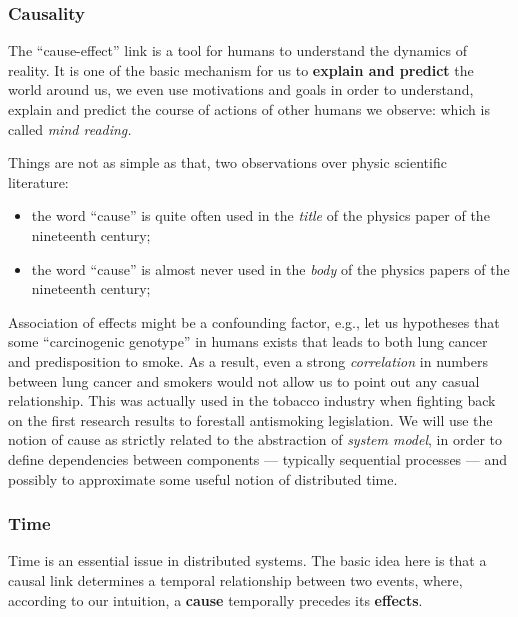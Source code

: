 \documentclass[11pt, a4paper]{article}
\begin{document}
\subsubsection{Causality}\label{sec:causality} %
\begin{note}
    The ``cause-effect'' link is a tool for humans to understand the dynamics of reality.
    It is one of the basic mechanism for us to \textbf{explain and predict} the world around us, we even use motivations and goals in order to understand, explain and predict the course of actions of other humans we observe: which is called \textit{mind reading.}
\end{note}
\begin{note}
    Things are not as simple as that, two observations over physic scientific literature:
    \begin{itemize}
        \item the word ``cause'' is quite often used in the \textit{title} of the physics paper of the nineteenth century;
        \item the word ``cause'' is almost never used in the \textit{body} of the physics papers of the nineteenth century;
    \end{itemize}
\end{note}
Association of effects might be a confounding factor, e.g., let us hypotheses that some ``carcinogenic genotype'' in humans exists that leads to both lung cancer and predisposition to smoke.
As a result, even a strong \textit{correlation} in numbers between lung cancer and smokers would not allow us to point out any casual relationship.
This was actually used in the tobacco industry when fighting back on the first research results to forestall antismoking legislation.
\emptyln{}
We will use the notion of cause as strictly related to the abstraction of \textit{system model}, in order to define dependencies between components --- typically sequential processes --- and possibly to approximate some useful notion of distributed time.
%
\subsubsection{Time}\label{sec:time} %
Time is an essential issue in distributed systems.
The basic idea here is that a causal link determines a temporal relationship between two events, where, according to our intuition, a \textbf{cause} temporally precedes its \textbf{effects}.
%
\end{document}
